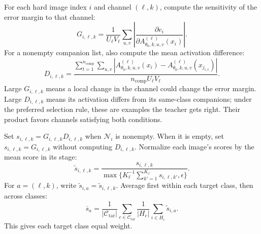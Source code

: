 \documentclass[10pt,journal,compsoc]{IEEEtran}
\theoremstyle{definition}
\begin{document}
For each hard image index $i$ and channel $(\ell,k)$, compute
the sensitivity of the error margin to that channel:
\begin{equation}
\label{eq:repair-sensitivity}
G_{i,\ell,k}=
\frac{1}{U_\ell V_\ell}
\sum_{u,v}
\left|
\frac{\partial e_i}
{\partial A_{\theta_0,k,u,v}^{(\ell)}(x_i)}
\right|.
\end{equation}
For a nonempty companion list, also compute the mean
activation difference:
\begin{equation}
\label{eq:repair-discrepancy}
D_{i,\ell,k}=
\frac{\sum_{t=1}^{n_{\mathrm{comp}}}\sum_{u,v}
\left|
A_{\theta_0,k,u,v}^{(\ell)}(x_i)-
A_{\theta_0,k,u,v}^{(\ell)}(x_{j_{i,t}})
\right|}
{n_{\mathrm{comp}}U_\ell V_\ell}.
\end{equation}
Large $G_{i,\ell,k}$ means a local change in the channel
could change the error margin. Large $D_{i,\ell,k}$ means
its activation differs from its same-class companions;
under the preferred selection rule, these are examples
the teacher gets right. Their product favors channels
satisfying both conditions.

Set $s_{i,\ell,k}=G_{i,\ell,k}D_{i,\ell,k}$ when
$\mathcal N_i$ is nonempty. When it is empty, set
$s_{i,\ell,k}=G_{i,\ell,k}$ without computing $D_{i,\ell,k}$.
Normalize each image's scores by the mean score in its stage:
\begin{equation}
\label{eq:repair-channel-score}
\widetilde{s}_{i,\ell,k}=
\frac{s_{i,\ell,k}}
{\max\{K_\ell^{-1}\sum_{k'=1}^{K_\ell}
s_{i,\ell,k'},\epsilon\}}.
\end{equation}
For $a=(\ell,k)$, write
$\widetilde{s}_{i,a}=\widetilde{s}_{i,\ell,k}$.
Average first within each target class, then across classes:
\begin{equation}
\label{eq:repair-consensus}
\overline{s}_a=
\frac{1}{|\mathcal C_{\mathrm{tar}}|}
\sum_{c\in\mathcal C_{\mathrm{tar}}}
\frac{1}{|H_c|}\sum_{i\in H_c}\widetilde{s}_{i,a}.
\end{equation}
This gives each target class equal weight.
\end{document}

